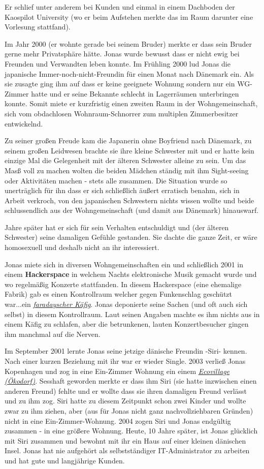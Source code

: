 Er schlief unter anderem bei Kunden und einmal in einem Dachboden der Kaospilot University (wo er beim Aufstehen merkte das im Raum darunter eine Vorlesung stattfand).


Im Jahr 2000 (er wohnte gerade bei seinem Bruder) merkte er dass sein Bruder gerne mehr Privatsphäre hätte. Jonas wurde bewusst dass er nicht ewig bei Freunden und Verwandten leben konnte. Im Frühling 2000 lud Jonas die japanische Immer-noch-nicht-Freundin für einen Monat nach Dänemark ein. Als sie zusagte ging ihm auf dass er keine geeignete Wohnung sondern nur ein WG-Zimmer hatte und er seine Bekannte schlecht in Lagerräumen unterbringen konnte. Somit miete er kurzfristig einen zweiten Raum in der Wohngemeinschaft, sich vom obdachlosen Wohnraum-Schnorrer zum multiplen Zimmerbesitzer entwickelnd.

Zu seiner großen Freude kam die Japanerin ohne Boyfriend nach Dänemark, zu seinem großen Leidwesen brachte sie ihre kleine Schwester mit und er hatte kein einzige Mal die Gelegenheit mit der älteren Schwester alleine zu sein. Um das Masß voll zu machen wolten die beiden Mädchen ständig mit ihm Sight-seeing oder Aktivitäten machen  - stets alle zusammen. Die Situation wurde so unerträglich für ihn dass er sich schließlich äußert erratisch benahm, sich in Arbeit verkroch, von den japanischen Schwestern nichts wissen wollte und beide schlussendlich aus der Wohngemeinschaft (und damit aus Dänemark) hinauswarf.

Jahre später hat er sich für sein Verhalten entschuldigt und (der älteren Schwester) seine damaligen Gefühle gestanden. Sie dachte die ganze Zeit, er wäre homosexuell und deshalb nicht an ihr interessiert. 

Jonas miete sich in diversen Wohngemeinschaften ein und schließlich 2001 in einem \textbf{Hackerspace} in welchem Nachts elektronische Musik gemacht wurde und wo regelmäßig Konzerte stattfanden. In diesem Hackerspace (eine ehemalige Fabrik) gab es einen Kontrollraum welcher gegen Funkenschlag geschützt war...ein \href{http://goo.gl/wfPa4p}{\textit{faradayscher Käfig}}. Jonas deponierte seine Sachen (und oft auch sich selbst) in diesem Kontrollraum. Laut seinen Angaben machte es ihm nichts aus in einem Käfig zu schlafen, aber die betrunkenen, lauten Konzertbesucher gingen ihm manchmal auf die Nerven.

Im September 2001 lernte Jonas seine jetzige dänische Freundin -Siri- kennen. Nach einer kurzen Beziehung mit ihr war er wieder Single. 2003 verließ Jonas Kopenhagen und zog in eine Ein-Zimmer Wohnung ein einem \href{https://en.wikipedia.org/wiki/Ecovillage}{\textit{Ecovillage (Ökodorf)}}. Sesshaft geworden merkte er dass ihm Siri (sie hatte inzwischen einen anderen Freund) fehlte und er wollte dass sie ihren damaligen Freund verlässt und zu ihm zog. Siri hatte zu diesem Zeitpunkt schon zwei Kinder und wollte zwar zu ihm ziehen, aber (aus für Jonas nicht ganz nachvollziehbaren Gründen) nicht in eine Ein-Zimmer-Wohnung. 2004 zogen Siri und Jonas endgültig zusammen - in eine größere Wohnung. Heute, 10 Jahre später, ist Jonas glücklich mit Siri zusammen und bewohnt mit ihr ein Haus auf einer kleinen dänischen Insel. Jonas hat nie aufgehört als selbstständiger IT-Administrator zu arbeiten und hat gute und langjährige Kunden. 



